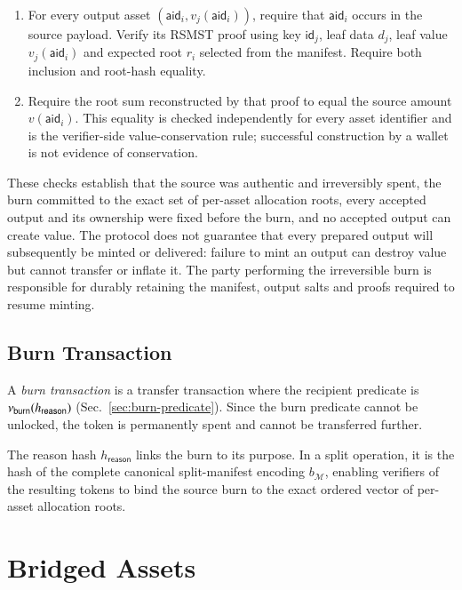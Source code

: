\begin{enumerate}
	\item For every output asset $(\mathsf{aid}_i,v_j(\mathsf{aid}_i))$, require that $\mathsf{aid}_i$ occurs in the source payload.  Verify its RSMST proof using key $\mathsf{id}_j$, leaf data $d_j$, leaf value $v_j(\mathsf{aid}_i)$ and expected root $r_i$ selected from the manifest.  Require both inclusion and root-hash equality.
	\item Require the root sum reconstructed by that proof to equal the source amount $v(\mathsf{aid}_i)$.  This equality is checked independently for every asset identifier and is the verifier-side value-conservation rule; successful construction by a wallet is not evidence of conservation.
\end{enumerate}

These checks establish that the source was authentic and irreversibly spent, the burn committed to the exact set of per-asset allocation roots, every accepted output and its ownership were fixed before the burn, and no accepted output can create value.  The protocol does not guarantee that every prepared output will subsequently be minted or delivered: failure to mint an output can destroy value but cannot transfer or inflate it.  The party performing the irreversible burn is responsible for durably retaining the manifest, output salts and proofs required to resume minting.

\subsection{Burn Transaction}\label{sec:burn-transaction}

A \emph{burn transaction} is a transfer transaction where the recipient predicate is $\nu_\mathsf{burn}(h_\mathsf{reason})$ (Sec.~\ref{sec:burn-predicate}). Since the burn predicate cannot be unlocked, the token is permanently spent and cannot be transferred further.

The reason hash $h_\mathsf{reason}$ links the burn to its purpose. In a split operation, it is the hash of the complete canonical split-manifest encoding $b_\mathcal{M}$, enabling verifiers of the resulting tokens to bind the source burn to the exact ordered vector of per-asset allocation roots.


\section{Bridged Assets}\label{sec:bridged-assets}

